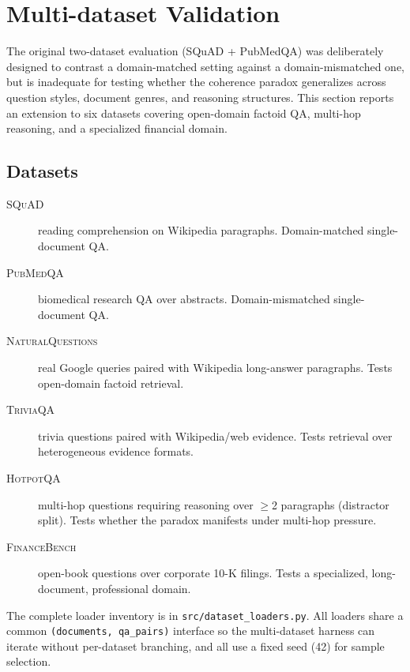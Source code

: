 \section{Multi-dataset Validation}
\label{sec:multidataset}

The original two-dataset evaluation (SQuAD + PubMedQA) was deliberately
designed to contrast a domain-matched setting against a
domain-mismatched one, but is inadequate for testing whether the
coherence paradox generalizes across question styles, document genres,
and reasoning structures. This section reports an extension to six
datasets covering open-domain factoid QA, multi-hop reasoning, and a
specialized financial domain.

\subsection{Datasets}

\begin{description}
  \item[\textsc{SQuAD}~\citep{rajpurkar2016squad}] reading comprehension
        on Wikipedia paragraphs. Domain-matched single-document QA.
  \item[\textsc{PubMedQA}~\citep{jin2019pubmedqa}] biomedical research
        QA over abstracts. Domain-mismatched single-document QA.
  \item[\textsc{NaturalQuestions}~\citep{kwiatkowski2019nq}] real Google
        queries paired with Wikipedia long-answer paragraphs. Tests
        open-domain factoid retrieval.
  \item[\textsc{TriviaQA}~\citep{joshi2017triviaqa}] trivia questions
        paired with Wikipedia/web evidence. Tests retrieval over
        heterogeneous evidence formats.
  \item[\textsc{HotpotQA}~\citep{yang2018hotpotqa}] multi-hop questions
        requiring reasoning over $\geq$2 paragraphs (distractor split).
        Tests whether the paradox manifests under multi-hop pressure.
  \item[\textsc{FinanceBench}~\citep{islam2023financebench}] open-book
        questions over corporate 10-K filings. Tests a specialized,
        long-document, professional domain.
\end{description}

The complete loader inventory is in \texttt{src/dataset\_loaders.py}.
All loaders share a common \texttt{(documents, qa\_pairs)} interface so
the multi-dataset harness can iterate without per-dataset branching, and
all use a fixed seed (42) for sample selection.

